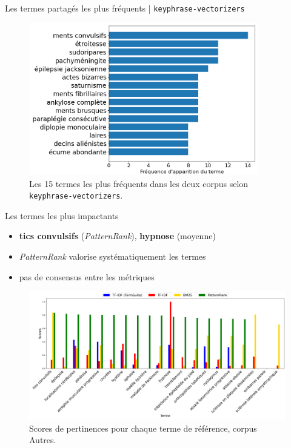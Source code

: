 \begin{frame}{Les termes partagés les plus fréquents | \texttt{keyphrase-vectorizers}}
	\begin{figure}[!ht]
		\centering
		\includegraphics[width=100mm,scale=0.5]{pic/termes_partages.png}
		\caption{Les 15 termes les plus fréquents dans les deux corpus selon \texttt{keyphrase-vectorizers}.}
		\label{fig:enter-label}
	\end{figure}
\end{frame}



\begin{frame}{Les termes les plus impactants}
	\begin{itemize}
		\item  \textbf{tics convulsifs} (\textit{PatternRank}), \textbf{hypnose} (moyenne)
		\item \textit{PatternRank} valorise systématiquement les termes
		\item pas de consensus entre les métriques
	\end{itemize}
	\begin{figure}[h]
		\centering
		\includegraphics[width=\linewidth]{pic/termes_viz.png}
		\caption{Scores de pertinences pour chaque terme de référence, corpus \og{}Autres\fg{}.}
		\label{fig:ling_out_TAL}
	\end{figure}
\end{frame}



